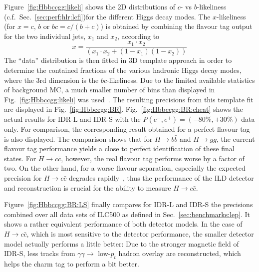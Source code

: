 Figure~\ref{fig:Hbbccgg:likeli} shows the 2D distributions of $c$- vs $b$-likeliness (c.f.\ Sec.~\ref{sec:perf:hlr:lcfi})for the different Higgs decay modes. The $x$-likeliness (for $x=c$, $b$ or $bc=c/(b+c)$) is obtained by combining the flavour tag output for the two individual jets, $x_1$ and $x_2$, according to
\begin{equation}
x = \frac{x_1 \cdot x_2}{(x_1\cdot x_2+(1-x_1)(1-x_2))}
\label{eqn:flavourtag}
\end{equation}
The ``data'' distribution is then fitted in 3D template approach in order to determine the contained fractions of the various hadronic Higgs decay modes, where the 3rd dimension is the $bc$-likeliness. Due to the limited available statistics of background MC, a much smaller number of bins than displayed in Fig.~\ref{fig:Hbbccgg:likeli} was used~\cite{ILDNote:Hbbccgg}. The resulting precisions from this template fit are displayed in Fig.~\ref{fig:Hbbccgg:BR}.  Fig.~\ref{fig:Hbbccgg:BR:cheat} shows the actual results for IDR-L and IDR-S with the $P(e^-,e^+)=(-80\%,+30\%)$ data only. For comparison,  the corresponding result obtained for a perfect flavour tag is also displayed. The comparison shows that for $H \to b\bar{b}$ and $H \to gg$, the current flavour tag performance yields a close to perfect identification of these final states. For $H \to c\bar{c}$, however, the
real flavour tag performs worse by a factor of two. On the other hand, for a worse flavour separation, especially the expected precision for $H \to c\bar{c}$ degrades rapidly~\cite{ILDNote:Hbbccgg},
thus the performance of the ILD detector and reconstruction is crucial for the ability to measure $H \to c\bar{c}$.

Figure~\ref{fig:Hbbccgg:BR:LS} finally compares for IDR-L and IDR-S the precisions combined over all data sets of ILC500 as defined in Sec.~\ref{sec:benchmarks:lep}. It shows a rather equivalent performance of both detector models. In the case of $H \to c\bar{c}$, which is most sensitive to the detector performance, the smaller detector model actually performs a little better: Due to the stronger magnetic field of IDR-S, less tracks from $\gamma\gamma \to$ low-$p_t$ hadron overlay are reconstructed, which helps the charm tag to perform a bit better. 


